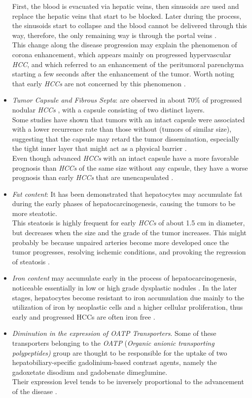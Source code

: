 \documentclass[]{article}
\begin{document}
\begin{itemize}
First, the blood is evacuated via hepatic veins, then sinusoids are used
and replace the hepatic veins that start to be blocked. Later during the
process, the sinusoids start to collapse and the blood cannot be
delivered through this way, therefore, the only remaining way is through
the portal veins \cite{Ueda1998,Kitao2009}. \\
This change along the disease progression may explain the phenomenon of
corona enhancement, which appears mainly on progressed hypervascular
\emph{HCC}, and which referred to an enhancement of the peritumoral
parenchyma starting a few seconds after the enhancement of the tumor.
Worth noting that early \emph{HCCs} are not concerned by this phenomenon
\cite{Matsui2011}.
\item \emph{Tumor Capsule and Fibrous Septa}: are observed in about 70\% of
  progressed nodular \emph{HCCs} \cite{Kojiro2005},
  with a capsule consisting of two distinct layers.\\
  Some studies have shown that tumors with an intact capsule were
  associated with a lower recurrence rate than those without (tumors of
  similar size), suggesting that the capsule may retard the tumor
  dissemination, especially the tight inner layer that might act as a
  physical barrier \cite{Ng1992}.\\
  Even though advanced \emph{HCCs} with an intact capsule have a more
  favorable prognosis than \emph{HCCs} of the same size without any
  capsule, they have a worse prognosis than early \emph{HCCs} that are
  unencapsulated \cite{Iguchi2009}.
\item \emph{Fat content}: It has been demonstrated that hepatocytes may
  accumulate fat during the early phases of hepatocarcinogenesis,
  causing the tumors to be more steatotic.\\
  This steatosis is highly frequent for early \emph{HCCs} of about 1.5
  cm in diameter, but decreases when the size and the grade of the tumor
  increases. This might probably be because unpaired arteries become
  more developed once the tumor progresses, resolving ischemic
  conditions, and provoking the regression of steatosis \cite{Kojiro2005, Kutami2000}.
\item
  \emph{Iron content} may accumulate early in the process of
  hepatocarcinogenesis, noticeable essentially in low or high grade
  dysplastic nodules \cite{Kojiro2009}. In the later
  stages, hepatocytes become resistant to iron accumulation due mainly
  to the utilization of iron by neoplastic cells and a higher cellular
  proliferation, thus early and progressed HCCs are often iron free
  \cite{Gurusamy2007}.
\item
  \emph{Diminution in the expression of OATP Transporters}. Some of
  these transporters belonging to the \emph{OATP} (\emph{Organic anionic
  transporting polypeptides)} group are thought to be responsible for
  the uptake of two hepatobiliary-specific gadolinium-based contrast
  agents, namely the gadoxetate disodium and gadobenate dimeglumine.\\
  Their expression level tends to be inversely proportional to the
  advancement of the disease \cite{Kitao2011,Tsuboyama2010}.
\end{itemize}
\end{document}
